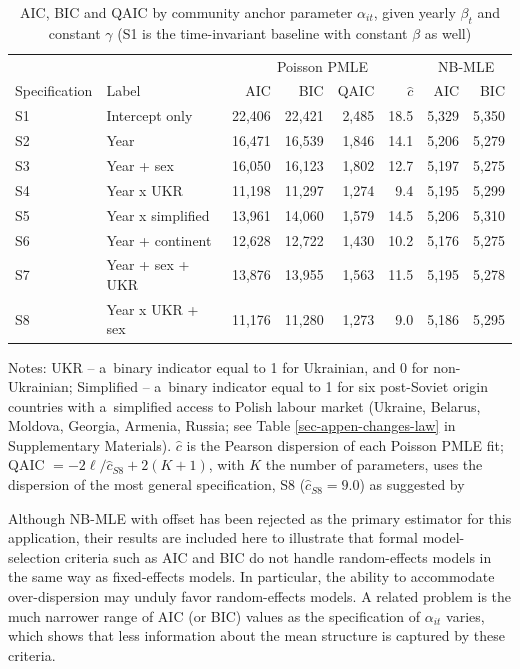 \begin{table}[H]
\centering
\caption{\label{tbl-aic-specs}AIC, BIC and QAIC by community anchor parameter $\alpha_{it}$, given yearly $\beta_t$ and constant $\gamma$ (S1 is the time-invariant baseline with constant $\beta$ as well)}
\begin{tabular}{llrrrr|rr} \toprule
& & \multicolumn{4}{c|}{Poisson PMLE} & \multicolumn{2}{c}{NB-MLE} \\
Specification & Label & AIC & BIC & QAIC & $\hat c$ & AIC & BIC \\ \midrule
S1 & Intercept only & 22,406 & 22,421 & 2,485 & 18.5 & 5,329 & 5,350 \\
S2 & Year & 16,471 & 16,539 & 1,846 & 14.1 & 5,206 & 5,279 \\
S3 & Year + sex & 16,050 & 16,123 & 1,802 & 12.7 & 5,197 & 5,275 \\
S4 & Year x UKR & 11,198 & 11,297 & 1,274 & 9.4 & 5,195 & 5,299 \\
S5 & Year x simplified & 13,961 & 14,060 & 1,579 & 14.5 & 5,206 & 5,310 \\
S6 & Year + continent & 12,628 & 12,722 & 1,430 & 10.2 & 5,176 & 5,275 \\
S7 & Year + sex + UKR & 13,876 & 13,955 & 1,563 & 11.5 & 5,195 & 5,278 \\
S8 & Year x UKR + sex & 11,176 & 11,280 & 1,273 & 9.0 & 5,186 & 5,295 \\
\bottomrule
\end{tabular}
\begin{minipage}{\linewidth}
\vspace{.05em}
\scriptsize
Notes: UKR -- a~binary indicator equal to 1 for Ukrainian, and 0 for non-Ukrainian; Simplified -- a~binary indicator equal to 1 for six post-Soviet origin countries with a~simplified access to Polish labour market (Ukraine, Belarus, Moldova, Georgia, Armenia, Russia; see Table \ref{sec-appen-changes-law} in Supplementary Materials). $\hat c$ is the Pearson dispersion of each Poisson PMLE fit; QAIC $= -2\ell/\hat c_{S8} + 2(K+1)$, with $K$ the number of parameters, uses the dispersion of the most general specification, S8 ($\hat c_{S8} = 9.0$) as suggested by \citet[p. 69]{burnham2002model}
\end{minipage}
\end{table}


Although NB-MLE with offset has been rejected as the primary estimator for this application, their results are included here to illustrate that formal model-selection criteria such as AIC and BIC do not handle random-effects models in the same way as fixed-effects models. In particular, the ability to accommodate over-dispersion may unduly favor random-effects models. A related problem is the much narrower range of AIC (or BIC) values as the specification of $\alpha_{it}$ varies, which shows that less information about the mean structure is captured by these criteria. 

